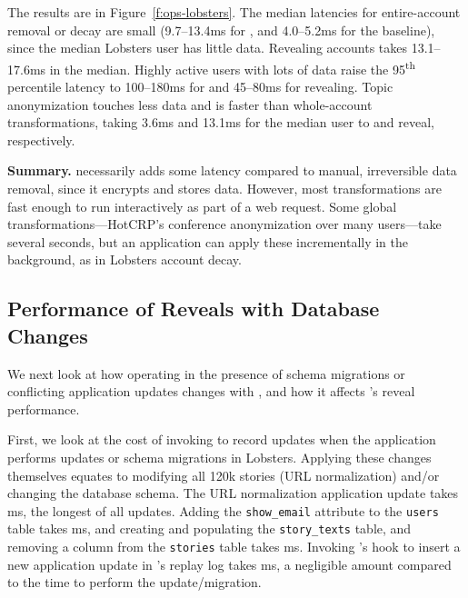%
The results are in Figure~\ref{f:ops-lobsters}.
%
The median latencies for entire-account removal or decay are small (9.7--13.4ms
for \sys, and 4.0--5.2ms for the baseline), since the median Lobsters user has
little data. Revealing \xxed accounts takes 13.1--17.6ms in the median.
%
Highly active users with lots of data raise the 95\textsuperscript{th} percentile
latency to 100--180ms for \xxing and 45--80ms for revealing.
%
Topic anonymization touches less data and is faster than
whole-account transformations, taking 3.6ms and 13.1ms for the median user to
\xx and reveal, respectively.
%

\textbf{Summary.}
%
\sys necessarily adds some latency compared to manual, irreversible data
removal, since it encrypts and stores \xxed data.
%
However, most \xxing transformations are fast enough to run interactively as
part of a web request.
%
Some global \xxing transformations---\eg HotCRP's conference anonymization over
many users---take several seconds, but an application can apply these
incrementally in the background, as in Lobsters account decay.
%
%
\subsection{Performance of Reveals with Database Changes}
\label{s:eval:updates}

We next look at how operating in the presence of schema migrations or
conflicting application updates changes with \sys, and how it affects \sys's
reveal performance. 

First, we look at the cost of invoking \sys to record updates when the
application performs updates or schema migrations in Lobsters.
%
Applying these changes themselves equates to modifying all 120k stories (\eg URL 
normalization) and/or changing the database schema.  The URL normalization
application update takes ms, the longest of all updates.
%
Adding the \texttt{show\_email} attribute to the \texttt{users} table takes
ms, and 
%
creating and populating the \texttt{story\_texts} table, and removing a column
from the \texttt{stories} table takes ms.
%
Invoking \sys's hook to insert a new application update in \sys's replay log
takes ms, a negligible amount compared to the time to perform the
update/migration.
%
%

